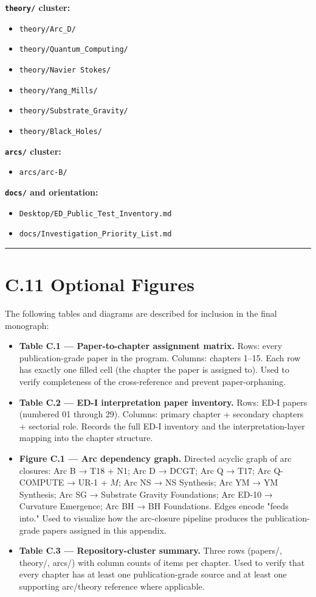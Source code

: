 \documentclass[11pt]{book}
\begin{document}
\textbf{\texttt{theory/} cluster:}
\begin{itemize}
\item \texttt{theory/Arc\_D/}
\item \texttt{theory/Quantum\_Computing/}
\item \texttt{theory/Navier Stokes/}
\item \texttt{theory/Yang\_Mills/}
\item \texttt{theory/Substrate\_Gravity/}
\item \texttt{theory/Black\_Holes/}
\end{itemize}

\textbf{\texttt{arcs/} cluster:}
\begin{itemize}
\item \texttt{arcs/arc-B/}
\end{itemize}

\textbf{\texttt{docs/} and orientation:}
\begin{itemize}
\item \texttt{Desktop/ED\_Public\_Test\_Inventory.md}
\item \texttt{docs/Investigation\_Priority\_List.md}
\end{itemize}

\bigskip\hrule\bigskip

\section{C.11 Optional Figures}

The following tables and diagrams are described for inclusion in the final monograph:

\begin{itemize}
\item \textbf{Table C.1 — Paper-to-chapter assignment matrix.} Rows: every publication-grade paper in the program. Columns: chapters 1–15. Each row has exactly one filled cell (the chapter the paper is assigned to). Used to verify completeness of the cross-reference and prevent paper-orphaning.
\item \textbf{Table C.2 — ED-I interpretation paper inventory.} Rows: ED-I papers (numbered 01 through 29). Columns: primary chapter + secondary chapters + sectorial role. Records the full ED-I inventory and the interpretation-layer mapping into the chapter structure.
\item \textbf{Figure C.1 — Arc dependency graph.} Directed acyclic graph of arc closures: Arc B → T18 + N1; Arc D → DCGT; Arc Q → T17; Arc Q-COMPUTE → UR-1 + $M$; Arc NS → NS Synthesis; Arc YM → YM Synthesis; Arc SG → Substrate Gravity Foundations; Arc ED-10 → Curvature Emergence; Arc BH → BH Foundations. Edges encode "feeds into." Used to visualize how the arc-closure pipeline produces the publication-grade papers assigned in this appendix.
\item \textbf{Table C.3 — Repository-cluster summary.} Three rows (papers/, theory/, arcs/) with column counts of items per chapter. Used to verify that every chapter has at least one publication-grade source and at least one supporting arc/theory reference where applicable.
\end{itemize}
\end{document}
